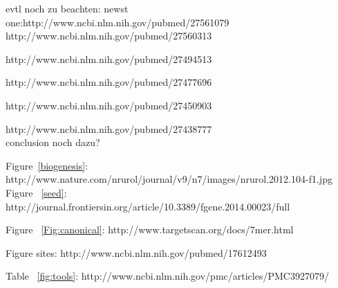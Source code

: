 \documentclass[12pt]{article}
\begin{document}
evtl noch zu beachten:
newst one:http://www.ncbi.nlm.nih.gov/pubmed/27561079
http://www.ncbi.nlm.nih.gov/pubmed/27560313

http://www.ncbi.nlm.nih.gov/pubmed/27494513
  
http://www.ncbi.nlm.nih.gov/pubmed/27477696

http://www.ncbi.nlm.nih.gov/pubmed/27450903

http://www.ncbi.nlm.nih.gov/pubmed/27438777
\\


conclusion noch dazu?


\newpage



\listoffigures


\listoftables


Figure~\ref{biogenesis}: \cite{Kelly} http://www.nature.com/nrurol/journal/v9/n7/images/nrurol.2012.104-f1.jpg
Figure ~\ref{seed}: http://journal.frontiersin.org/article/10.3389/fgene.2014.00023/full

Figure ~\ref{Fig:canonical}: http://www.targetscan.org/docs/7mer.html

Figure sites: http://www.ncbi.nlm.nih.gov/pubmed/17612493

Table ~\ref{fig:tools}: http://www.ncbi.nlm.nih.gov/pmc/articles/PMC3927079/
\end{document}
